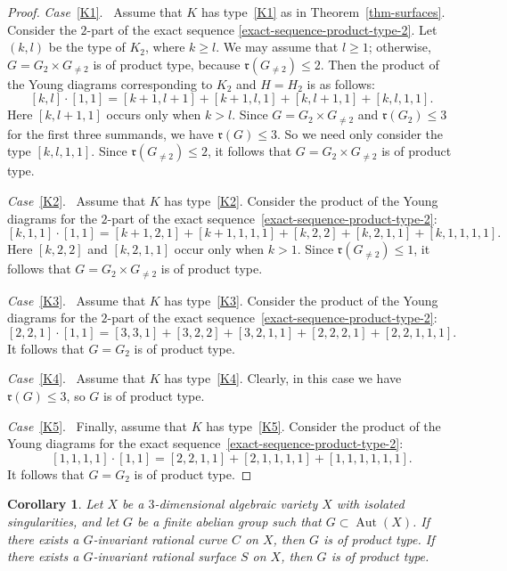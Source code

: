\documentclass[11pt]{amsart}
\numberwithin{equation}{section}
\newtheorem{corollary}[thm]{Corollary}
\theoremstyle{definition}
\theoremstyle{remark}
\DeclareMathOperator{\Aut}{Aut}
\begin{document}
\begin{proof}
\emph{Case}~\eqref{K1}.~ Assume that $K$ has type~\eqref{K1} as in Theorem~\ref{thm-surfaces}.  Consider the $2$-part of the exact sequence \eqref{exact-sequence-product-type-2}.  Let $(k, l)$ be the type of $K_2$, where $k\geq l$. We may assume that $l\geq 1$; otherwise, $G=G_2\times G_{\neq 2}$ is of product type, because $\mathfrak{r}(G_{\neq 2})\leq 2$.  Then the product of the Young diagrams corresponding to $K_2$ and $H=H_2$ is as follows:
\[
[k,l]\cdot[1,1] = [k+1,l+1] + [k+1, l, 1] + [k, l+1, 1] + [k,l,1,1].
\]
Here $[k,l+1,1]$ occurs only when $k>l$.
Since $G=G_2\times G_{\neq 2}$ and $\mathfrak{r}(G_2)\leq 3$ for the first three summands, we have $\mathfrak{r}(G)\leq 3$. So
we need only consider the type $[k,l,1,1]$. 
Since $\mathfrak{r}(G_{\neq 2})\leq 2$, it follows that $G=G_2\times G_{\neq 2}$ is of product type.

\emph{Case}~\eqref{K2}.~ 
Assume that $K$ has type~\eqref{K2}.
Consider the product of the Young diagrams for the $2$-part of the exact sequence~\eqref{exact-sequence-product-type-2}:
\[
[k,1,1]\cdot[1,1] = [k+1, 2, 1] + [k+1, 1, 1, 1] + [k, 2, 2] + [k, 2, 1, 1] + [k, 1, 1, 1, 1].
\]
Here $[k,2,2]$ and $[k,2,1,1]$ occur only when $k>1$.
Since $\mathfrak{r}(G_{\neq 2})\leq 1$, it follows that $G=G_2\times G_{\neq 2}$ is of product type.

\emph{Case}~\eqref{K3}.~ 
Assume that $K$ has type~\eqref{K3}.
Consider the product of the Young diagrams for the $2$-part of the exact sequence~\eqref{exact-sequence-product-type-2}:
\[
[2, 2, 1]\cdot[1,1] = [3, 3, 1] + [3, 2, 2] + [3, 2, 1, 1] + [2, 2, 2, 1] + [2, 2, 1, 1, 1].
\]
It follows that $G=G_2$ is of product type. 

\emph{Case}~\eqref{K4}.~  
Assume that $K$ has type~\eqref{K4}.
Clearly, in this case we have $\mathfrak{r}(G)\leq 3$, so $G$ is of product type. 

\emph{Case}~\eqref{K5}.~  
Finally, assume that $K$ has type~\eqref{K5}.
Consider the product of the Young diagrams for the exact sequence~\eqref{exact-sequence-product-type-2}:
\[
[1,1,1,1]\cdot[1,1] = [2, 2, 1, 1] + [2, 1, 1, 1, 1] + [1, 1, 1, 1, 1, 1].
\]
It follows that $G=G_2$ is of product type.
\end{proof}

\begin{corollary}
\label{cor-inv-curve-or-surface}
Let $X$ be a $3$-dimensional algebraic variety $X$ with isolated singularities, and let $G$ be a finite abelian group such that $G\subset \Aut(X)$.
If there exists a $G$-invariant rational curve $C$ on $X$, then $G$ is of product type.
If there exists a $G$-invariant rational surface $S$ on $X$, then $G$ is of product type.
\end{corollary}
\end{document}
